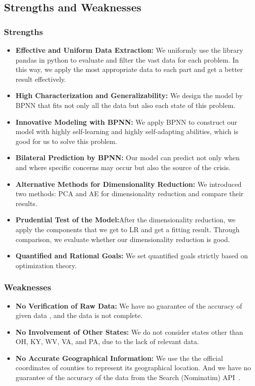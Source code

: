 \documentclass{mcmthesis}
\begin{document}
\subsection{Strengths and Weaknesses}
\subsubsection{Strengths}
\begin{itemize}
\item \textbf {Effective and Uniform Data Extraction:} We uniformly use the library pandas in python  to evaluate and filter the vast data for each problem. In this way, we apply the most appropriate data to each part and get a better result effectively.

\item \textbf{High Characterization and Generalizability:} We design the model by BPNN that fits not only all the data but also each state of this problem.

\item \textbf{Innovative Modeling with BPNN:} We apply BPNN to construct our model with highly self-learning and highly self-adapting abilities, which is good for us to solve this problem.

\item \textbf{Bilateral Prediction by BPNN:} Our model can predict not only when and where specific concerns may occur but also the source of the crisis.

\item \textbf{Alternative Methods for Dimensionality Reduction:} We introduced two methods: PCA and AE for dimensionality reduction and compare their results.

\item \textbf{Prudential Test of the Model:}After the dimensionality reduction, we apply the components that we get to LR and get a fitting result. Through comparison, we evaluate whether our dimensionality reduction is good.

\item \textbf{Quantified and Rational Goals:} We set quantified goals strictly based on optimization theory.
\end{itemize}


\subsubsection{Weaknesses}
\begin{itemize}
\item \textbf{No Verification of Raw Data:} We have no guarantee of the accuracy of given data , and the data is not complete.
\item \textbf{No Involvement of Other States:} We do not consider states other than OH, KY, WV, VA, and PA, due to the lack of relevant data.
\item \textbf{No Accurate Geographical Information: } We use the the official coordinates of counties to represent its geographical location. And we have no guarantee of the accuracy of the data  from the Search (Nominatim) API~\cite{bing}.
\end{itemize}
\end{document}
